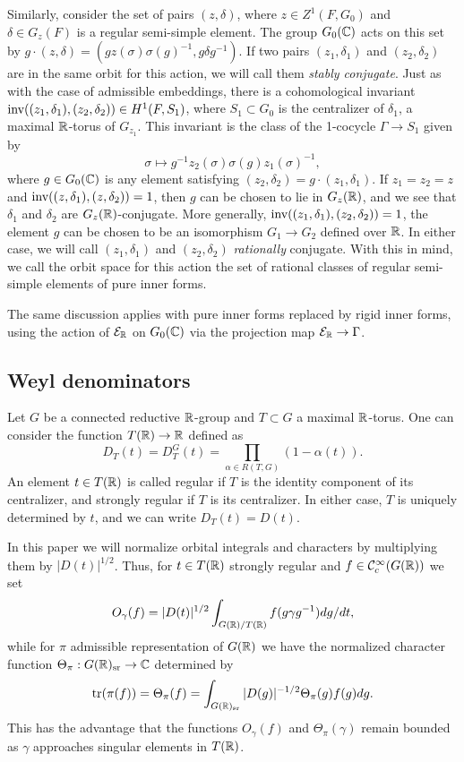 \documentclass{article}
\theoremstyle{definition}
\numberwithin{equation}{section}
\renewcommand{\-}{\hyp{}}
\begin{document}
Similarly, consider the set of pairs $(z,\delta)$, where $z \in Z^1(F,G_0)$ and $\delta \in G_z(F)$ is a regular semi-simple element. The group $G_0(\mathbb{C})$ acts on this set by $g\cdot (z,\delta)=(gz(\sigma)\sigma(g)^{-1},g\delta g^{-1})$. If two pairs $(z_1,\delta_1)$ and $(z_2,\delta_2)$ are in the same orbit for this action, we will call them \emph{stably conjugate}. Just as with the case of admissible embeddings, there is a cohomological invariant $\textrm{inv}((z_1,\delta_1),(z_2,\delta_2)) \in H^1(F,S_1)$, where $S_1 \subset G_0$ is the centralizer of $\delta_1$, a maximal $\mathbb{R}$-torus of $G_{z_1}$. This invariant is the class of the 1-cocycle $\Gamma \to S_1$ given by
\[ \sigma \mapsto g^{-1}z_2(\sigma)\sigma(g)z_1(\sigma)^{-1}, \]
where $g \in G_0(\mathbb{C})$ is any element satisfying $(z_2,\delta_2)=g \cdot (z_1,\delta_1)$. If $z_1=z_2=z$ and $\textrm{inv}((z,\delta_1),(z,\delta_2))=1$, then $g$ can be chosen to lie in $G_z(\mathbb{R})$, and we see that $\delta_1$ and $\delta_2$ are $G_z(\mathbb{R})$-conjugate. More generally, $\textrm{inv}((z_1,\delta_1),(z_2,\delta_2))=1$, the element $g$ can be chosen to be an isomorphism $G_1 \to G_2$ defined over $\mathbb{R}$. In either case, we will call $(z_1,\delta_1)$ and $(z_2,\delta_2)$ \emph{rationally} conjugate. With this in mind, we call the orbit space for this action the set of rational classes of regular semi-simple elements of pure inner forms. 

The same discussion applies with pure inner forms replaced by rigid inner forms, using the action of $\mathcal{E}_{\mathbb{R}}$ on $G_0(\mathbb{C})$ via the projection map $\mathcal{E}_{\mathbb{R}} \to \Gamma$.

\subsection{Weyl denominators} \label{sub:weyldenom}

Let $G$ be a connected reductive $\mathbb{R}$-group and $T \subset G$ a maximal $\mathbb{R}$-torus. One can consider the function $T(\mathbb{R}) \to \mathbb{R}$ defined as
\[ D_T(t) = D_T^G(t) = \textstyle\prod\limits_{\alpha \in R(T,G)} (1-\alpha(t)). \]
An element $t \in T(\mathbb{R})$ is called regular if $T$ is the identity component of its centralizer, and strongly regular if $T$ is its centralizer. In either case, $T$ is uniquely determined by $t$, and we can write $D_T(t)=D(t)$.

In this paper we will normalize orbital integrals and characters by multiplying them by $|D(t)|^{1/2}$. Thus, for $t \in T(\mathbb{R})$ strongly regular and $f \in \mathcal{C}_c^\infty(G(\mathbb{R}))$ we set
\[ O_\gamma(f) = |D(t)|^{1/2}\int_{G(\mathbb{R})/T(\mathbb{R})} f(g\gamma g^{-1})dg/dt, \]
while for $\pi$ admissible representation of $G(\mathbb{R})$ we have the normalized character function $\Theta_\pi : G(\mathbb{R})_{\textrm{sr}} \to \mathbb{C}$ determined by
\[ \textrm{tr}(\pi(f)) = \Theta_\pi(f) = \int_{G(\mathbb{R})_{\textrm{sr}}} |D(g)|^{-1/2}\Theta_\pi(g)f(g)dg. \]
This has the advantage that the functions $O_\gamma(f)$ and $\Theta_\pi(\gamma)$  remain bounded as $\gamma$ approaches singular elements in $T(\mathbb{R})$.
\end{document}
